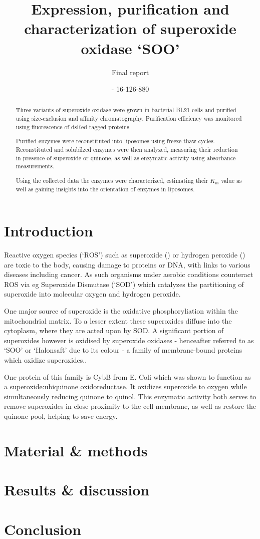 \documentclass[a4paper]{scrartcl}
\title{Expression, purification and characterization of superoxide oxidase `SOO'}
\subtitle{Final report}
\author{\maillink{michael.senn@students.unibe.ch}{Michael Senn} - 16-126-880}
\date{\printdate}
\begin{document}
\maketitle

\begin{abstract}
	Three variants of superoxide oxidase were grown in bacterial BL21 cells
	and purified using size-exclusion and affinity chromatography.
	Purification efficiency was monitored using fluorescence of
	dsRed-tagged proteins.

	Purified enzymes were reconstituted into liposomes using freeze-thaw
	cycles. Reconstituted and solubilzed enzymes were then analyzed,
	measuring their reduction in presence of superoxide or quinone, as well
	as enzymatic activity using absorbance measurements.

	Using the collected data the enzymes were characterized, estimating
	their $K_m$ value as well as gaining insights into the orientation of
	enzymes in liposomes.
\end{abstract}

\newpage
\part*{Introduction}

Reactive oxygen species (`ROS') such as superoxide () or hydrogen
peroxide () are toxic to the body, causing damage to proteins or DNA,
with links to various diseases including cancer. As such organisms under
aerobic conditions counteract ROS via eg Superoxide Dismutase (`SOD') which
catalyzes the partitioning of superoxide into molecular oxygen and hydrogen
peroxide.

One major source of superoxide is the oxidative phosphoryliation within the
mitochondrial matrix. \cite{Novo2008} To a lesser extent these superoxides
diffuse into the cytoplasm, where they are acted upon by SOD. A significant
portion of superoxides however is oxidised by superoxide oxidases - henceafter
referred to as `SOO' or `Halonsaft' due to its colour - a family of
membrane-bound proteins which oxidize superoxides.\cite{superoxide_salvaging}.

One protein of this family is CybB from E. Coli which was shown to function as
a superoxide:ubiquinone oxidoreductase. It oxidizes superoxide to oxygen while
simultaneously reducing quinone to quinol.\cite{superoxide_salvaging} This
enzymatic activity both serves to remove superoxides in close proximity to the
cell membrane, as well as restore the quinone pool, helping to save energy.


\newpage
\part*{Material \& methods}

\newpage
\part*{Results \& discussion}

\newpage
\part*{Conclusion}





\end{document}
